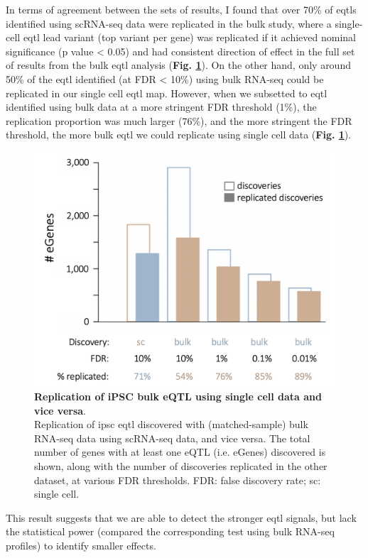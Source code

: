 In terms of agreement between the sets of results, I found that over 70\% of \glspl{eqtl} identified using scRNA-seq data were replicated in the bulk study, where a single-cell \gls{eqtl} lead variant (top variant per gene) was replicated if it achieved nominal significance (p value < 0.05) and had consistent direction of effect in the full set of results from the bulk \gls{eqtl} analysis (\textbf{Fig. \ref{fig:sc_bulk_egenes}}). 
On the other hand, only around 50\% of the \gls{eqtl} identified (at FDR < 10\%) using bulk RNA-seq could be replicated in our single cell \gls{eqtl} map.
However, when we subsetted to \gls{eqtl} identified using bulk data at a more stringent FDR threshold (1\%), the replication proportion was much larger (76\%), and the more stringent the FDR threshold, the more bulk \gls{eqtl} we could replicate using single cell data (\textbf{Fig. \ref{fig:sc_bulk_egenes}}).

\begin{figure}[h]
\centering
\includegraphics[width=12cm]{Chapter3/Fig/sc_vs_bulk_eqtl.png}
\caption[iPSC eQTL (bulk vs sc)]{\textbf{Replication of iPSC bulk eQTL using single cell data and vice versa}.\\
Replication of \gls{ipsc} \gls{eqtl} discovered with (matched-sample) bulk RNA-seq data using scRNA-seq data, and vice versa.
The total number of genes with at least one eQTL (i.e. eGenes) discovered is shown, along with the number of discoveries replicated in the other dataset, at various FDR thresholds. 
FDR: false discovery rate; sc: single cell.}
\label{fig:sc_bulk_egenes}
\end{figure}

This result suggests that we are able to detect the stronger \gls{eqtl} signals, but lack the statistical power (compared the corresponding test using bulk RNA-seq profiles) to identify smaller effects.


